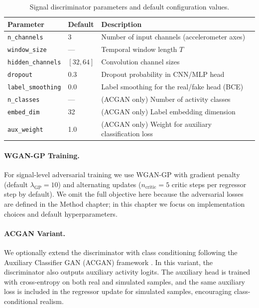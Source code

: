 \begin{table}[!t]
\centering
\caption{Signal discriminator parameters and default configuration values.}
\label{tab:ds-params}
\begin{tabular}{llp{6.5cm}}
\hline
\textbf{Parameter} & \textbf{Default} & \textbf{Description} \\
\hline
\texttt{n\_channels} & 3 & Number of input channels (accelerometer axes) \\
\texttt{window\_size} & --- & Temporal window length $T$ \\
\texttt{hidden\_channels} & $[32, 64]$ & Convolution channel sizes \\
\texttt{dropout} & 0.3 & Dropout probability in CNN/MLP head \\
\texttt{label\_smoothing} & 0.0 & Label smoothing for the real/fake head (BCE) \\
\texttt{n\_classes} & --- & (ACGAN only) Number of activity classes \\
\texttt{embed\_dim} & 32 & (ACGAN only) Label embedding dimension \\
\texttt{aux\_weight} & 1.0 & (ACGAN only) Weight for auxiliary classification loss \\
\hline
\end{tabular}
\end{table}

\paragraph{WGAN-GP Training.} For signal-level adversarial training we use WGAN-GP \cite{arjovsky2017wasserstein, gulrajani2017improved} with gradient penalty (default $\lambda_{\text{GP}}=10$) and alternating updates ($n_{\text{critic}}=5$ critic steps per regressor step by default). We omit the full objective here because the adversarial losses are defined in the Method chapter; in this chapter we focus on implementation choices and default hyperparameters.

\paragraph{ACGAN Variant.} We optionally extend the discriminator with class conditioning following the Auxiliary Classifier GAN (ACGAN) framework \cite{odena2017conditional}. In this variant, the discriminator also outputs auxiliary activity logits. The auxiliary head is trained with cross-entropy on both real and simulated samples, and the same auxiliary loss is included in the regressor update for simulated samples, encouraging class-conditional realism.

